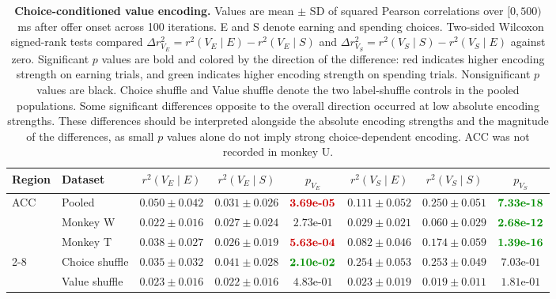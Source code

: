 \documentclass[pdflatex,sn-mathphys-num]{sn-jnl}%
\begin{document}
\clearpage
\begin{table}[p]\centering
\caption{\textbf{Choice-conditioned value encoding.} Values are mean $\pm$ SD of squared Pearson correlations over $[0,500)$~ms after offer onset across 100 iterations. E and S denote earning and spending choices. Two-sided Wilcoxon signed-rank tests compared $\Delta r^2_{V_E}=r^2(V_E\mid E)-r^2(V_E\mid S)$ and $\Delta r^2_{V_S}=r^2(V_S\mid S)-r^2(V_S\mid E)$ against zero. Significant $p$ values are bold and colored by the direction of the difference: red indicates higher encoding strength on earning trials, and green indicates higher encoding strength on spending trials. Nonsignificant $p$ values are black. Choice shuffle and Value shuffle denote the two label-shuffle controls in the pooled populations. Some significant differences opposite to the overall direction occurred at low absolute encoding strengths. These differences should be interpreted alongside the absolute encoding strengths and the magnitude of the differences, as small $p$ values alone do not imply strong choice-dependent encoding. ACC was not recorded in monkey U.}
\label{tab:supp_choice_conditioned}
\begingroup\fontsize{8}{10}\selectfont\setlength{\tabcolsep}{3pt}
\begin{tabular*}{\textwidth}{@{\extracolsep{\fill}}llcccccc@{}}\toprule
Region & Dataset & $r^2(V_E\mid E)$ & $r^2(V_E\mid S)$ & $p_{V_E}$ & $r^2(V_S\mid E)$ & $r^2(V_S\mid S)$ & $p_{V_S}$ \\
\midrule
ACC & Pooled & $0.050 \pm  0.042$ & $0.031 \pm  0.026$ & $\textcolor[HTML]{CC0000}{\text{\bfseries \mbox{3.69e-05}}}$ & $0.111 \pm  0.052$ & $0.250 \pm  0.051$ & $\textcolor[HTML]{008C00}{\text{\bfseries \mbox{7.33e-18}}}$ \\
  & Monkey W & $0.022 \pm  0.016$ & $0.027 \pm  0.024$ & $\mbox{2.73e-01}$ & $0.029 \pm  0.021$ & $0.060 \pm  0.029$ & $\textcolor[HTML]{008C00}{\text{\bfseries \mbox{2.68e-12}}}$ \\
  & Monkey T & $0.038 \pm  0.027$ & $0.026 \pm  0.019$ & $\textcolor[HTML]{CC0000}{\text{\bfseries \mbox{5.63e-04}}}$ & $0.082 \pm  0.046$ & $0.174 \pm  0.059$ & $\textcolor[HTML]{008C00}{\text{\bfseries \mbox{1.39e-16}}}$ \\
\cmidrule(l){2-8}
  & Choice shuffle & $0.035 \pm  0.032$ & $0.041 \pm  0.028$ & $\textcolor[HTML]{008C00}{\text{\bfseries \mbox{2.10e-02}}}$ & $0.254 \pm  0.053$ & $0.253 \pm  0.049$ & $\mbox{7.03e-01}$ \\
  & Value shuffle & $0.023 \pm  0.016$ & $0.022 \pm  0.016$ & $\mbox{4.83e-01}$ & $0.023 \pm  0.019$ & $0.019 \pm  0.011$ & $\mbox{1.81e-01}$ \\

\end{tabular*}
\end{table}
\end{document}
